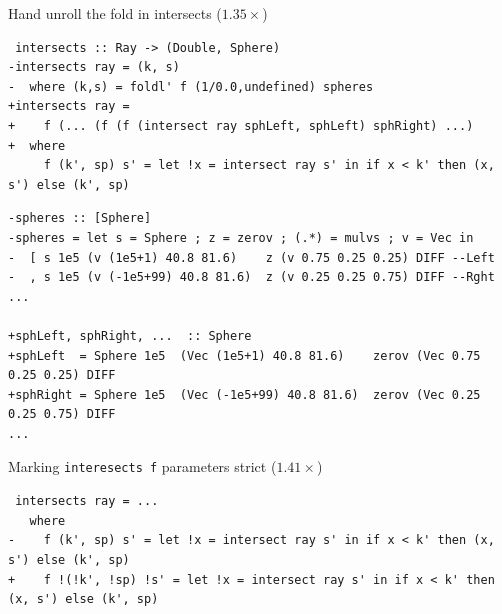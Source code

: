 \documentclass[8pt]{beamer}
\begin{document}
\begin{frame}[fragile]{Hand unroll the fold in intersects ($1.35\times$)}

\begin{verbatim}
 intersects :: Ray -> (Double, Sphere)
-intersects ray = (k, s)
-  where (k,s) = foldl' f (1/0.0,undefined) spheres
+intersects ray =
+    f (... (f (f (intersect ray sphLeft, sphLeft) sphRight) ...)
+  where
     f (k', sp) s' = let !x = intersect ray s' in if x < k' then (x, s') else (k', sp)
\end{verbatim}


\begin{verbatim}
-spheres :: [Sphere]
-spheres = let s = Sphere ; z = zerov ; (.*) = mulvs ; v = Vec in
-  [ s 1e5 (v (1e5+1) 40.8 81.6)    z (v 0.75 0.25 0.25) DIFF --Left
-  , s 1e5 (v (-1e5+99) 40.8 81.6)  z (v 0.25 0.25 0.75) DIFF --Rght
...

+sphLeft, sphRight, ...  :: Sphere
+sphLeft  = Sphere 1e5  (Vec (1e5+1) 40.8 81.6)    zerov (Vec 0.75 0.25 0.25) DIFF
+sphRight = Sphere 1e5  (Vec (-1e5+99) 40.8 81.6)  zerov (Vec 0.25 0.25 0.75) DIFF
...
\end{verbatim}

\end{frame}

\begin{frame}[fragile]{Marking \texttt{interesects f} parameters strict ($1.41\times$)}
\begin{verbatim}
 intersects ray = ...
   where
-    f (k', sp) s' = let !x = intersect ray s' in if x < k' then (x, s') else (k', sp)
+    f !(!k', !sp) !s' = let !x = intersect ray s' in if x < k' then (x, s') else (k', sp)
\end{verbatim}
\end{frame}

\end{document}
